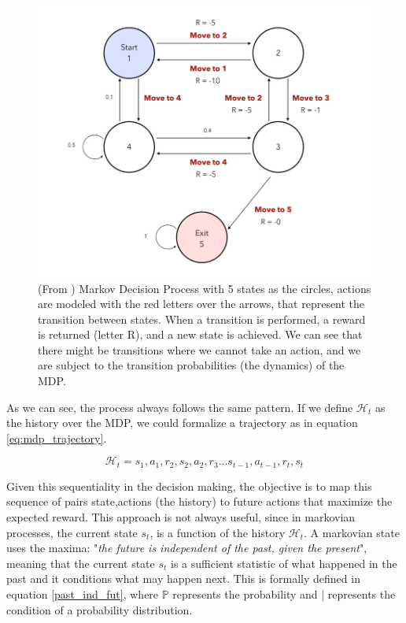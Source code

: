 \begin{figure}[!h]
	\centering
	\includegraphics[width=0.8\linewidth]{figures/mdp.png}
	\caption{ (From \cite{markovdecisionprocessgithub}) Markov Decision Process with 5 states as the circles, actions are modeled with the red letters over the arrows, that represent the transition between states. When a transition is performed, a reward is returned (letter R), and a new state is achieved. We can see that there might be transitions where we cannot take an action, and we are subject to the transition probabilities (the dynamics) of the MDP.}
	\label{fig:mdp}
\end{figure} 

As we can see, the process always follows the same pattern. If we define $\mathcal{H}_t$ as the history over the MDP, we could formalize a trajectory as in equation \ref{eq:mdp_trajectory}.

\begin{equation} \label{eq:mdp_trajectory}
	\mathcal{H}_t = s_1, a_1, r_2, s_2, a_2, r_3 ... s_{t-1}, a_{t-1}, r_t, s_t
\end{equation}

Given this sequentiality in the decision making, the objective is to map this sequence of pairs state,actions (the history) to future actions that maximize the expected reward. This approach is not always useful, since in markovian processes, the current state $s_t$, is a function of the history $\mathcal{H}_t$. A markovian state uses the maxima: "\textit{the future is independent of the past, given the present}", meaning that the current state $s_t$ is a sufficient statistic of what happened in the past and it conditions what may happen next. This is formally defined in equation \ref{past_ind_fut}, where $\mathbb{P}$ represents the probability and $|$ represents the condition of a probability distribution.

